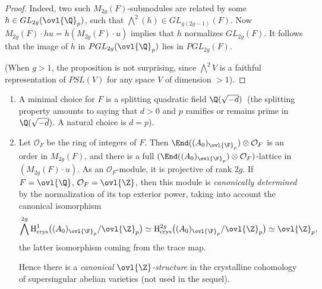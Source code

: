 \begin{para}
 \begin{proof} Indeed, two such $M_{2g}(F)$-submodules are related 
 by some $h\in GL_{2g}(\ovl{\Q}_p)$, such that
 $\bigwedge^2(h)\in GL_{g(2g-1)}(F)$. Now 
 $M_{2g}(F)\cdot hu = h(M_{2g}(F)\cdot u)$ implies
 that $h$ normalizes
 $GL_{2g}(F)$. It follows that the image of $h$ in 
 $PGL_{2g}(\ovl{\Q}_p)$ lies in $PGL_{2g}(F)$.

  \noindent (When $g>1$, the proposition is not surprising, since
  $\bigwedge^2 V$ is a faithful representation of $PSL(V)$
  for any space $V$ of dimension $>1$).
 \end{proof}

\end{para}
\begin{rems}
 \begin{enumerate}
  \renewcommand{\theenumi}{\alph{enumi}}
  \item A minimal choice for $F$ is a splitting
	quadratic field $\Q(\sqrt{-d})\,$ (the splitting property amounts to
	saying that $d>0$ and $p$ ramifies  or remains prime in
	$\Q(\sqrt{-d})$. A natural choice is $d=p$).
  \item Let $\mathcal{O}_F$ be the ring of integers of $F$. Then
	$\End((A_0)_{\ovl{\F}_p})\otimes \mathcal{O}_F$ is an order in
	$M_{2g}(F)$, and there is a full
	$(\End((A_0)_{\ovl{\F}_p})\otimes \mathcal{O}_F)$-lattice in 
	$(M_{2g}(F)\cdot u)$. As an $\mathcal{O}_F$-module, it is
	projective of rank $2g$.  If $F=\ovl{\Q}$, \ie
	$\mathcal{O}_F=\ovl{\Z}$, then this module is 
	{\it canonically determined} by the
	normalization of its top exterior power, taking into account the 
	canonical isomorphism
	\begin{equation*}
	 \bigwedge^{2g}
	  \mathrm{H}^1_{\mathrm{crys}}\bigl((A_0)_{\ovl{\F}_p}/\ovl{\Z}_p\bigr)
	  \simeq
	  \mathrm{H}^{2g}_{\mathrm{crys}}
	  \bigl((A_0)_{\ovl{\F}_p}/\ovl{\Z}_p\bigr)
	  \simeq \ovl{\Z}_p,
	\end{equation*} 
	the latter isomorphism coming from the trace map. 
 
	Hence there is a 
	{\it canonical $\ovl{\Z}$-structure} in the
	crystalline cohomology of supersingular abelian 
	varieties (not used in the sequel).
 \end{enumerate}
\end{rems}

